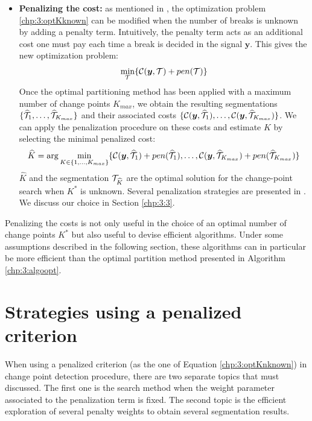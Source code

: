 \begin{itemize}
\begin{algorithm}[ht]
\end{algorithm} 
\item \textbf{Penalizing the cost:} as mentioned in \cite{truong2020}, the optimization problem \eqref{chp:3:optKknown} can be modified when the number of breaks is unknown by adding a penalty term. Intuitively, the penalty term acts as an additional cost one must pay each time a break is decided in the signal $\bm y$. This gives the new optimization problem: 
\begin{equation}\label{chp:3:optKnknown}
\min_{{\mathcal T}} \{ \mathcal{C}(\bm y,{\mathcal T}) + pen({\mathcal T}) \} 
\end{equation}   
Once the optimal partitioning method has been applied with a maximum number of change points $K_{max}$, we obtain the resulting segmentations $\{\widehat{{\mathcal T}}_1,\dots,\widehat{{\mathcal T}}_{K_{max}}\}$ and their associated costs $\{{\mathcal C}(\bm y, \widehat{{\mathcal T}}_1),\dots,{\mathcal C}(\bm y, \widehat{{\mathcal T}}_{K_{max}})\}$. We can apply the penalization procedure on these costs and estimate $K$ by selecting the minimal penalized cost:
\begin{equation}\label{chp:3:Khat}
\widehat{K} = \arg\min_{K \in \{1,\dots,K_{max}\}} \{{\mathcal C}(\bm y, \widehat{{\mathcal T}}_1)+pen(\widehat{{\mathcal T}}_1),\dots,{\mathcal C}(\bm y, \widehat{{\mathcal T}}_{K_{max}})+pen(\widehat{{\mathcal T}}_{K_{max}})\} 
\end{equation}
$\widehat{K}$ and the segmentation ${\mathcal T}_{\widehat{K}}$ are the optimal solution for the change-point search when $K^*$ is unknown. Several penalization strategies are presented in \cite{truong2020}. We discuss our choice in Section \ref{chp:3:3}.  
\end{itemize}    

Penalizing the costs is not only useful in the choice of an optimal number of change points $K^*$ but also useful to devise efficient algorithms. Under some assumptions described in the following section, these algorithms can in particular be more efficient than the optimal partition method presented in Algorithm \ref{chp:3:algoopt}. 

\section{Strategies using a penalized criterion}\label{chp:3:4}

When using a penalized criterion (as the one of Equation \eqref{chp:3:optKnknown}) in change point detection procedure, there are two separate topics that must discussed. The first one is the search method when the weight parameter associated to the penalization term is fixed. The second topic is the efficient exploration of several penalty weights to obtain several segmentation results.   


